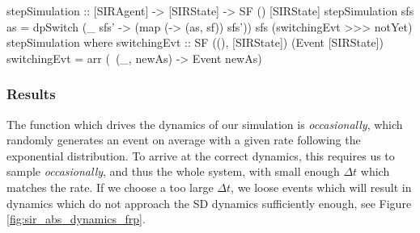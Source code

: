 \begin{HaskellCode}
stepSimulation :: [SIRAgent] -> [SIRState] -> SF () [SIRState]
stepSimulation sfs as =
    dpSwitch
      (\_ sfs' -> (map (\sf -> (as, sf)) sfs'))
      sfs
      (switchingEvt >>> notYet) 
      stepSimulation
  where
    switchingEvt :: SF ((), [SIRState]) (Event [SIRState])
    switchingEvt = arr (\ (_, newAs) -> Event newAs)
\end{HaskellCode}

\subsubsection{Results}
The function which drives the dynamics of our simulation is \textit{occasionally}, which randomly generates an event on average with a given rate following the exponential distribution. To arrive at the correct dynamics, this requires us to sample \textit{occasionally}, and thus the whole system, with small enough $\Delta t$ which matches the rate. If we choose a too large $\Delta t$, we loose events which will result in dynamics which do not approach the SD dynamics sufficiently enough, see Figure \ref{fig:sir_abs_dynamics_frp}.


